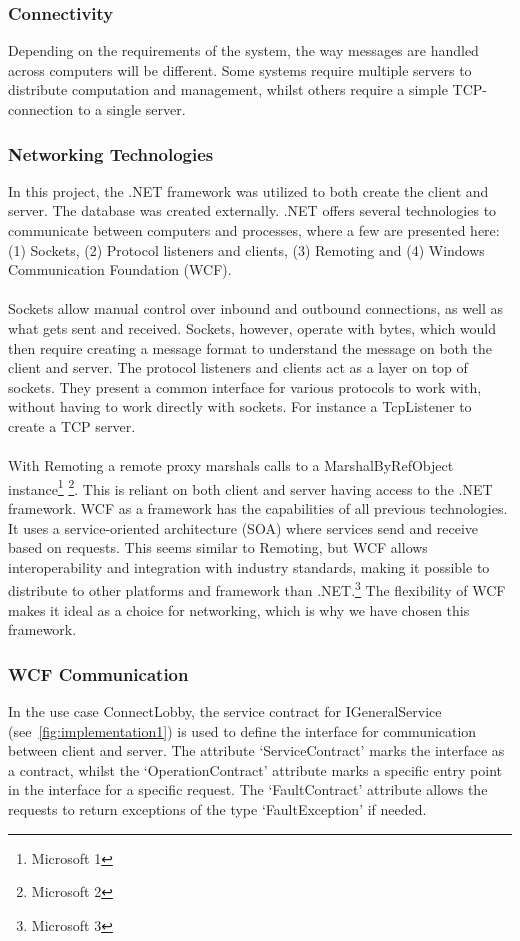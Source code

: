 \subsubsection {Connectivity}
Depending on the requirements of the system, the way messages are
handled across computers will be different. Some systems require
multiple servers to distribute computation and management, whilst
others require a simple TCP-connection to a single server.

\subsubsection {Networking Technologies}
In this project, the .NET framework was utilized to both create the
 client and server. The database was created externally. .NET offers
  several technologies to communicate between computers and processes,
   where a few are presented here: (1) Sockets, (2) Protocol listeners
    and clients, (3) Remoting and (4) Windows Communication Foundation (WCF).
\\\\
Sockets allow manual control over inbound and outbound connections, as
 well as what gets sent and received. Sockets, however, operate with bytes,
  which would then require creating a message format to understand the
   message on both the client and server. The protocol listeners and
   clients act as a layer on top of sockets. They present a common interface
    for various protocols to work with, without having to work directly with
    sockets. For instance a TcpListener to create a TCP server.
\\\\
With Remoting a remote proxy marshals calls to a MarshalByRefObject
instance\footnote{Microsoft 1} \footnote{Microsoft 2}. This is reliant
on both client and server having access to the .NET framework. WCF as a
framework has the capabilities of all previous technologies. It uses a
service-oriented architecture (SOA) where services send and receive based
 on requests. This seems similar to Remoting, but WCF allows interoperability
 and integration with industry standards, making it possible to distribute to
  other platforms and framework than .NET.\footnote{Microsoft 3} The
  flexibility of WCF makes it ideal as a choice for networking, which is
  why we have chosen this framework.

\subsubsection {WCF Communication}
In the use case ConnectLobby, the service contract for
IGeneralService (see~\ref{fig:implementation1}) is used to define the
 interface for communication between client and server. The attribute
 ‘ServiceContract’ marks the interface as a contract, whilst the
  ‘OperationContract’ attribute marks a specific entry point in the interface
  for a specific request. The ‘FaultContract’ attribute allows the requests
   to return exceptions of the type ‘FaultException’ if needed.

